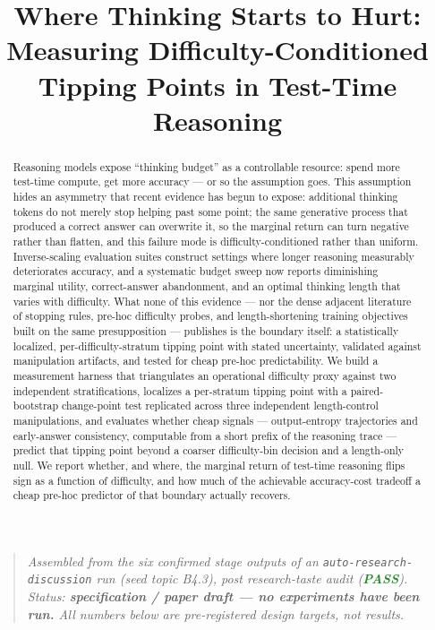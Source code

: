 \documentclass[11pt]{article}
\title{\textbf{Where Thinking Starts to Hurt:\\ Measuring Difficulty-Conditioned Tipping Points in Test-Time Reasoning}}
\author{}
\date{}
\begin{document}
\maketitle
\vspace{-2em}

\begin{quote}
\small\textit{Assembled from the six confirmed stage outputs of an \texttt{auto-research-discussion} run (seed topic B4.3), post research-taste audit (\textcolor{ForestGreen}{\textbf{PASS}}). Status: \textbf{specification / paper draft --- no experiments have been run.} All numbers below are pre-registered design targets, not results.}
\end{quote}

\begin{abstract}
Reasoning models expose ``thinking budget'' as a controllable resource: spend more test-time compute, get more accuracy --- or so the assumption goes. This assumption hides an asymmetry that recent evidence has begun to expose: additional thinking tokens do not merely stop helping past some point; the same generative process that produced a correct answer can overwrite it, so the marginal return can turn negative rather than flatten, and this failure mode is difficulty-conditioned rather than uniform. Inverse-scaling evaluation suites construct settings where longer reasoning measurably deteriorates accuracy, and a systematic budget sweep now reports diminishing marginal utility, correct-answer abandonment, and an optimal thinking length that varies with difficulty. What none of this evidence --- nor the dense adjacent literature of stopping rules, pre-hoc difficulty probes, and length-shortening training objectives built on the same presupposition --- publishes is the boundary itself: a statistically localized, per-difficulty-stratum tipping point with stated uncertainty, validated against manipulation artifacts, and tested for cheap pre-hoc predictability. We build a measurement harness that triangulates an operational difficulty proxy against two independent stratifications, localizes a per-stratum tipping point with a paired-bootstrap change-point test replicated across three independent length-control manipulations, and evaluates whether cheap signals --- output-entropy trajectories and early-answer consistency, computable from a short prefix of the reasoning trace --- predict that tipping point beyond a coarser difficulty-bin decision and a length-only null. We report whether, and where, the marginal return of test-time reasoning flips sign as a function of difficulty, and how much of the achievable accuracy-cost tradeoff a cheap pre-hoc predictor of that boundary actually recovers.
\end{abstract}
\end{document}
